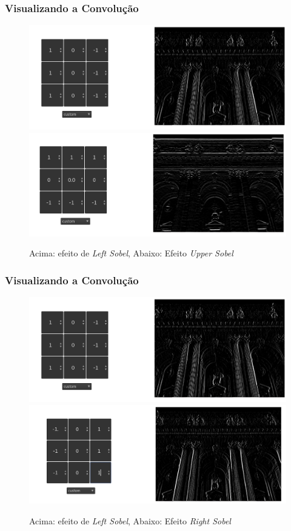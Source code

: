 \documentclass[tikz,10pt]{beamer}
\begin{document}
\begin{frame}
	\frametitle{Visualizando a Convolução}
	\centering
\begin{figure}[t!]
	\centering
	\includegraphics[width=0.7\linewidth]{images/convolucao/004_left_sobel} \\
	\includegraphics[width=0.7\linewidth]{images/convolucao/003_upper_sobel} \\
	\caption{Acima: efeito de \textit{Left Sobel}, Abaixo: Efeito \textit{Upper Sobel}}
	\label{fig:left_upper}
\end{figure}
\end{frame}


\begin{frame}
	\frametitle{Visualizando a Convolução}
	\centering
	
	\begin{figure}[t!]
		\centering
		\includegraphics[width=0.7\linewidth]{images/convolucao/004_left_sobel} \\
		\includegraphics[width=0.7\linewidth]{images/convolucao/005_right_sobel} \\
		\caption{Acima: efeito de \textit{Left Sobel}, Abaixo: Efeito \textit{Right Sobel}}
		\label{fig:left_right_sobel}
	\end{figure}
\end{frame}
\end{document}
